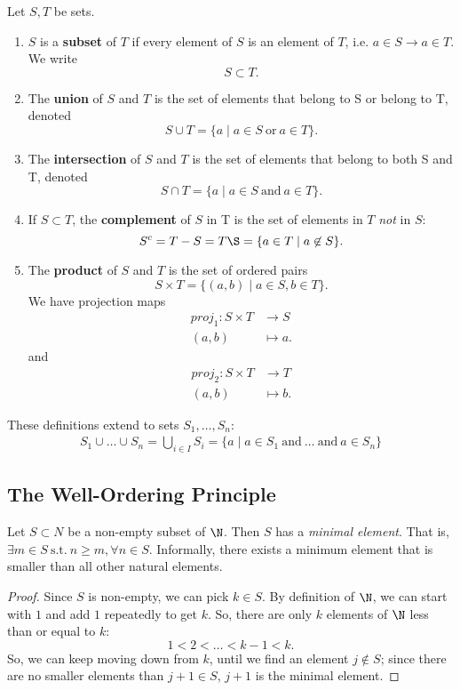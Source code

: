 \documentclass[math1530-lecture-notes.tex]{subfiles}
\begin{document}
\begin{definition}{}
  Let $S, T$ be sets.
  \begin{enumerate}
    \item $S$ is a \textbf{subset} of $T$ if every element of $S$ is an element of $T$, i.e. $a\in S\to a\in T$. We write \[
      S\subset T
     .\]
    \item The \textbf{union}  of $S$ and $T$ is the set of elements that belong to S or belong to T, denoted
      \[
      S\cup T = \{a\mid a\in S ~\text{or}~a\in T\}
      .\] 
    \item The \textbf{intersection} of $S$ and $T$ is the set of elements that belong to both S and
      T, denoted \[
      S\cap T = \{a\mid a\in S ~\text{and}~a \in T\}
      .\] 
    \item If $S\subset T$, the \textbf{complement} of $S$ in T is the set of elements in $T$ 
      \textit{not} in $S$: \[
      S^{c} = T - S = T\S = \{a\in T\mid a\not\in S\} 
      .\]
    \item The \textbf{product}  of $S$ and $T$ is the set of ordered pairs \[
        S\times T = \{\left( a, b \right) \mid a\in S, b\in T\} 
    .\] 
    We have projection maps \begin{align*}
      proj_1: S\times T &\longrightarrow S \\
      \left( a,b \right)  &\longmapsto a
    .\end{align*}
    and \begin{align*}
      proj_2: S\times T &\longrightarrow T \\
      \left( a,b \right)  &\longmapsto b
    .\end{align*}

  \end{enumerate}
\end{definition}

These definitions extend to sets $ S_1, \ldots, S_n$:
\begin{gather}
  S_1 \cup \ldots \cup S_n = \bigcup_{i \in  I} S_i = \{a \mid a\in S_1 ~\text{and}~ \ldots
  ~\text{and}~a\in S_n\} 
\end{gather}

\subsection{The Well-Ordering Principle}
\begin{theorem}{}
  Let $S\subset N$ be a non-empty subset of $\N$. Then $S$ has a \textit{minimal element}. That is,
  $\exists m\in S ~\text{s.t.}~ n\ge m, \forall n\in S$. Informally, there exists a minimum element
  that is smaller than all other natural elements.
\end{theorem}
\begin{proof}[Proof]
  Since $ S$ is non-empty, we can pick $k\in S$.
  By definition of $\N$, we can start with $1$ and add $1$ repeatedly to get $k$. So, there are only
  $k$ elements of $ \N$ less than or equal to $k$: \[
  1<2<\ldots<k-1<k
  .\]
  So, we can keep moving down from $k$, until we find an element $j\not\in S$; since there are no
  smaller elements than $j+1\in S$, $j+1$ is the minimal element. 
\end{proof}
\end{document}
